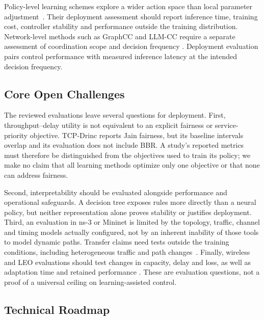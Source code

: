 \documentclass[a4paper,fleqn]{cas-sc}
\begin{document}
Policy-level learning schemes explore a wider action space than local
parameter adjustment~\citep{winstein2013remy,dong2018vivace,jay2019aurora,galliera2023marlin,pappone2025mutant}.
Their deployment assessment should report inference time, training cost,
controller stability and performance outside the training distribution.
Network-level methods such as GraphCC and LLM-CC require a separate
assessment of coordination scope and decision frequency
\citep{bernardez2025graphcc,huang2024llm}. Deployment evaluation pairs control performance with measured inference
latency at the intended decision frequency.

\subsection{Core Open Challenges}
\label{sec:ai_challenges}

The reviewed evaluations leave several questions for deployment. First,
throughput--delay utility is not equivalent to an explicit fairness or
service-priority objective. TCP-Drinc reports Jain fairness, but its
baseline intervals overlap and its evaluation does not include BBR.
A study's reported metrics must therefore be distinguished from the
objectives used to train its policy; we make no claim that all learning
methods optimize only one objective or that none can address fairness.

Second, interpretability should be evaluated alongside performance and
operational safeguards. A decision tree exposes rules more directly than
a neural policy, but neither representation alone proves stability or
justifies deployment. Third, an evaluation in ns-3 or Mininet is limited
by the topology, traffic, channel and timing models actually configured,
not by an inherent inability of those tools to model dynamic paths.
Transfer claims need tests outside the training conditions, including
heterogeneous traffic and path changes~\citep{jiang2021mlcc}.
Finally, wireless and LEO evaluations should test changes in capacity,
delay and loss, as well as adaptation time and retained performance
\citep{kamel2024starquic,laniewski2024road}. These are evaluation questions,
not a proof of a universal ceiling on learning-assisted control.

\subsection{Technical Roadmap}
\label{sec:ai_roadmap}
\end{document}
